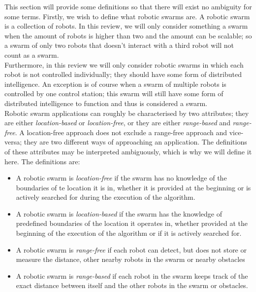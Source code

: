 
This section will provide some definitions so that there will exist no ambiguity for some terms. Firstly, we wish to define what robotic swarms are. A robotic swarm is a collection of robots. In this review, we will only consider something a swarm when the amount of robots is higher than two and the amount can be scalable; so a swarm of only two robots that doesn't interact with a third robot will not count as a swarm.  \\
Furthermore, in this review we will only consider robotic swarms in which each robot is not controlled individually; they should have some form of distributed intelligence. An exception is of course when a swarm of multiple robots is controlled by one control station; this swarm will still have some form of distributed intelligence to function and thus is considered a swarm.  \\

Robotic swarm applications can roughly be characterised by two attributes; they are either \emph{location-based} or \emph{location-free}, or they are either \emph{range-based} and  \emph{range-free}. A location-free approach does not exclude a range-free approach and vice-versa; they are two different ways of approaching an application. The definitions of these attributes may be interpreted ambiguously, which is why we will define it here. The definitions are:

  \begin{itemize}
    \item A robotic swarm is \emph{location-free} if the swarm has no knowledge of the boundaries of te location it is in, whether it is provided at the beginning or is actively searched for during the execution of the algorithm. 
    \item A robotic swarm is \emph{location-based} if the swarm has the knowledge of predefined boundaries of the location it operates in, whether provided at the beginning of the execution of the algorithm or if it is actively searched for. 
    \item A robotic swarm is \emph{range-free} if each robot can detect, but does not store or measure the distance, other nearby robots in the swarm or nearby obstacles
    \item  A robotic swarm is \emph{range-based} if each robot in the swarm keeps track of the exact distance between itself and the other robots in the swarm or obstacles. 
  \end{itemize}

